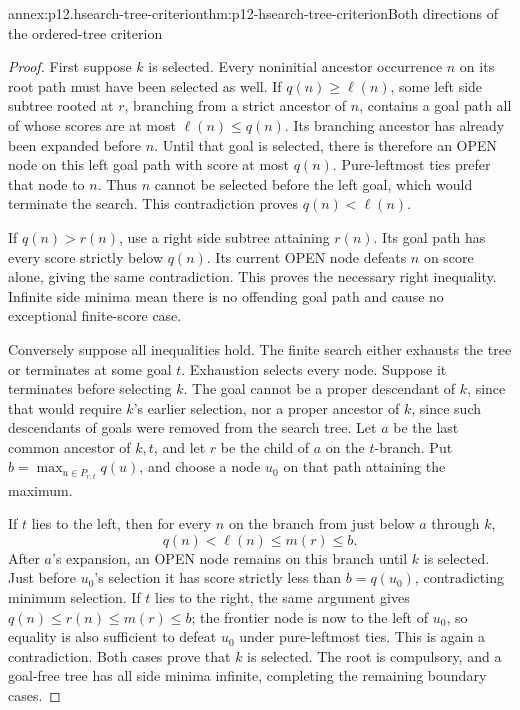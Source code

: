 \begin{annexitem}{annex:p12.hsearch-tree-criterion}{thm:p12-hsearch-tree-criterion}{Both directions of the ordered-tree criterion}
\begin{proof}
First suppose \(k\) is selected. Every noninitial ancestor occurrence
\(n\) on its root path must have been selected as well. If
\(q(n)\ge\ell(n)\), some left side subtree rooted at \(r\),
branching from a strict ancestor of \(n\), contains a goal path
all of whose scores are at most \(\ell(n)\le q(n)\).
Its branching ancestor has already been expanded before \(n\).
Until that goal is selected, there is therefore an OPEN node on this
left goal path with score at most \(q(n)\). Pure-leftmost ties
prefer that node to \(n\). Thus \(n\) cannot be selected before
the left goal, which would terminate the search. This contradiction
proves \(q(n)<\ell(n)\).

If \(q(n)>r(n)\), use a right side subtree attaining \(r(n)\).
Its goal path has every score strictly below \(q(n)\). Its current
OPEN node defeats \(n\) on score alone, giving the same contradiction.
This proves the necessary right inequality. Infinite side minima mean
there is no offending goal path and cause no exceptional finite-score case.

Conversely suppose all inequalities hold. The finite search either
exhausts the tree or terminates at some goal \(t\). Exhaustion selects
every node. Suppose it terminates before selecting \(k\). The goal
cannot be a proper descendant of \(k\), since that would require
\(k\)'s earlier selection, nor a proper ancestor of \(k\), since
such descendants of goals were removed from the search tree. Let
\(a\) be the last common ancestor of \(k,t\), and let \(r\)
be the child of \(a\) on the \(t\)-branch. Put
\(b=\max_{u\in P_{r,t}}q(u)\), and choose a node \(u_0\)
on that path attaining the maximum.

If \(t\) lies to the left, then for every \(n\) on the branch
from just below \(a\) through \(k\),
\[
 q(n)<\ell(n)\le m(r)\le b.
\]
After \(a\)'s expansion, an OPEN node remains on this branch
until \(k\) is selected. Just before \(u_0\)'s selection it
has score strictly less than \(b=q(u_0)\), contradicting minimum
selection. If \(t\) lies to the right, the same argument gives
\(q(n)\le r(n)\le m(r)\le b\); the frontier node is now to
the left of \(u_0\), so equality is also sufficient to defeat
\(u_0\) under pure-leftmost ties. This is again a contradiction.
Both cases prove that \(k\) is selected. The root is compulsory,
and a goal-free tree has all side minima infinite, completing the
remaining boundary cases.
\end{proof}
\end{annexitem}

